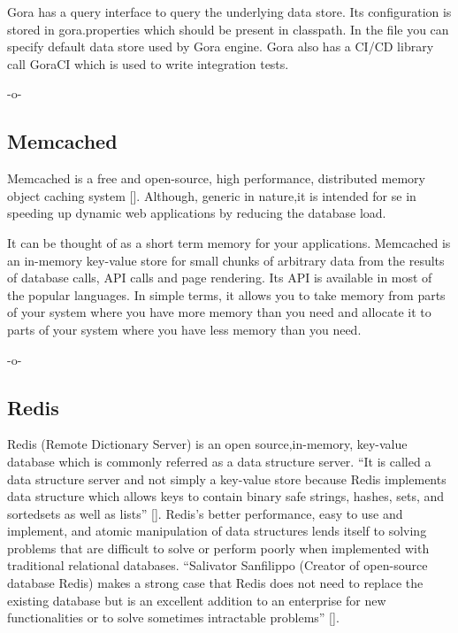 Gora has a query interface to query the underlying data store. Its
configuration is stored in gora.properties which should be present in
classpath. In the file you can specify default data store used by Gora
engine. Gora also has a CI/CD library call GoraCI which is used to
write integration tests.

     -o-

\subsection{Memcached}

Memcached is a free and open-source, high performance, distributed
memory object caching system [\cite{www-memcached}].  Although,
generic in nature,it is intended for se in speeding up dynamic web
applications by reducing the database load.

It can be thought of as a short term memory for your applications.
Memcached is an in-memory key-value store for small chunks of
arbitrary data from the results of database calls, API calls and page
rendering. Its API is available in most of the popular languages. In
simple terms, it allows you to take memory from parts of your system
where you have more memory than you need and allocate it to parts of
your system where you have less memory than you need.

     -o-
     
\subsection{Redis}

Redis (Remote Dictionary Server) is an open source,in-memory,
key-value database which is commonly referred as a data structure
server. ``It is called a data structure server and not simply a
key-value store because Redis implements data structure which allows
keys to contain binary safe strings, hashes, sets, and sortedsets as
well as lists'' [\cite{redis-book-2011}].  Redis's better performance,
easy to use and implement, and atomic manipulation of data structures
lends itself to solving problems that are difficult to solve or
perform poorly when implemented with traditional relational
databases. ``Salivator Sanfilippo (Creator of open-source database
Redis) makes a strong case that Redis does not need to replace the
existing database but is an excellent addition to an enterprise for
new functionalities or to solve sometimes intractable problems''
[\cite{redis-book-2016}].

